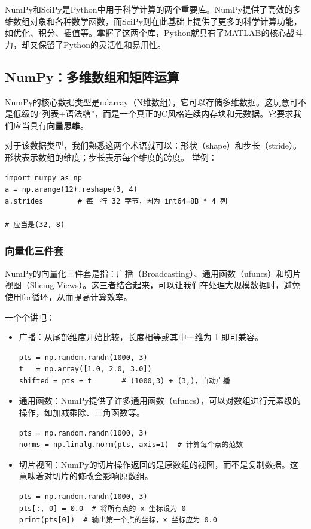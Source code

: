 NumPy和SciPy是Python中用于科学计算的两个重要库。NumPy提供了高效的多维数组对象和各种数学函数，而SciPy则在此基础上提供了更多的科学计算功能，如优化、积分、插值等。掌握了这两个库，Python就具有了MATLAB的核心战斗力，却又保留了Python的灵活性和易用性。

\subsection{NumPy：多维数组和矩阵运算}

NumPy的核心数据类型是ndarray（N维数组），它可以存储多维数据。这玩意可不是低级的“列表+语法糖”，而是一个真正的C风格连续内存块和元数据。它要求我们应当具有\textbf{向量思维}。

对于该数据类型，我们熟悉这两个术语就可以：形状（shape）和步长（stride）。形状表示数组的维度；步长表示每个维度的跨度。
举例：
\begin{verbatim}
import numpy as np
a = np.arange(12).reshape(3, 4)
a.strides        # 每一行 32 字节，因为 int64=8B * 4 列

# 应当是(32, 8)
\end{verbatim}

\subsubsection{向量化三件套}

NumPy的向量化三件套是指：广播（Broadcasting）、通用函数（ufuncs）和切片视图（Slicing Views）。这三者结合起来，可以让我们在处理大规模数据时，避免使用for循环，从而提高计算效率。

一个个讲吧：
\begin{itemize}
  \item 广播：从尾部维度开始比较，长度相等或其中一维为 1 即可兼容。
    \begin{verbatim}
pts = np.random.randn(1000, 3)
t   = np.array([1.0, 2.0, 3.0])
shifted = pts + t       # (1000,3) + (3,)，自动广播
    \end{verbatim}
  \item 通用函数：NumPy提供了许多通用函数（ufuncs），可以对数组进行元素级的操作，如加减乘除、三角函数等。
    \begin{verbatim}
pts = np.random.randn(1000, 3)
norms = np.linalg.norm(pts, axis=1)  # 计算每个点的范数
\end{verbatim}
  \item 切片视图：NumPy的切片操作返回的是原数组的视图，而不是复制数据。这意味着对切片的修改会影响原数组。
    \begin{verbatim}
pts = np.random.randn(1000, 3)
pts[:, 0] = 0.0  # 将所有点的 x 坐标设为 0
print(pts[0])  # 输出第一个点的坐标，x 坐标应为 0.0
    \end{verbatim}
\end{itemize}


